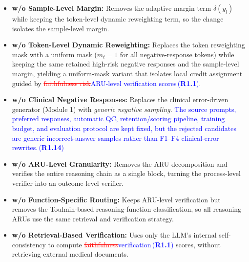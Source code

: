 \documentclass[a4paper,fleqn,doubleblind]{cas-sc}
\DeclareRobustCommand{\deleted}[1]{\textcolor{red}{\sout{#1}}}
\DeclareRobustCommand{\added}[1]{\textcolor{blue}{#1}}
\DeclareRobustCommand{\revtag}[1]{\textcolor{blue}{\scriptsize\,(\textbf{#1})}}
\begin{document}
\begin{itemize}[leftmargin=*]
    \item \textbf{w/o Sample-Level Margin:} Removes the adaptive margin term $\delta(y_l)$ while keeping the token-level dynamic reweighting term, so the change isolates the sample-level margin.
    \item \textbf{w/o Token-Level Dynamic Reweighting:} Replaces the token reweighting mask with a uniform mask ($m_t = 1$ for all negative-response tokens) while keeping the same retained high-risk negative responses and the sample-level margin, yielding a uniform-mask variant that isolates local credit assignment guided by \deleted{faithfulness risk}\added{ARU-level verification scores}\revtag{R1.1}.
    \item \textbf{w/o Clinical Negative Responses:} Replaces the clinical error-driven generator (Module 1) with \textit{generic negative sampling}. \added{The source prompts, preferred responses, automatic QC, retention/scoring pipeline, training budget, and evaluation protocol are kept fixed, but the rejected candidates are generic incorrect-answer samples rather than F1--F4 clinical-error rewrites.}\revtag{R1.14}
    \item \textbf{w/o ARU-Level Granularity:} Removes the ARU decomposition and verifies the entire reasoning chain as a single block, turning the process-level verifier into an outcome-level verifier.
    \item \textbf{w/o Function-Specific Routing:} Keeps ARU-level verification but removes the Toulmin-based reasoning-function classification, so all reasoning ARUs use the same retrieval and verification strategy.
    \item \textbf{w/o Retrieval-Based Verification:} Uses only the LLM's internal self-consistency to compute \deleted{faithfulness}\added{verification}\revtag{R1.1} scores, without retrieving external medical documents.
\end{itemize}
\end{document}
